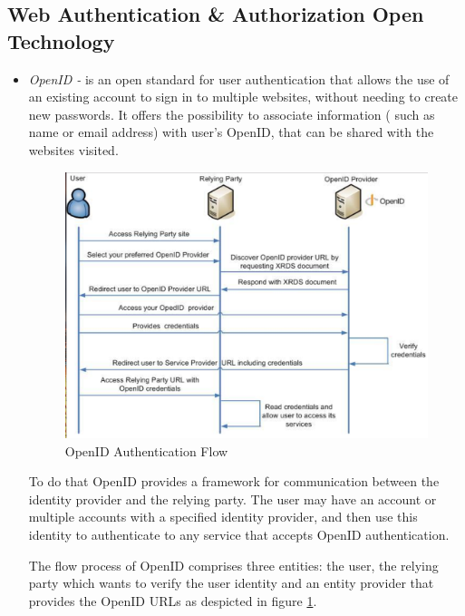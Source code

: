 \subsection{Web Authentication \& Authorization Open Technology}\label{ssec:security}


\begin{itemize}
\item {\it OpenID -} is an open standard for user authentication that allows the use of an existing account to sign in to multiple websites, without needing to create new passwords. It offers the possibility to associate information ( such as name or email address) with user's OpenID, that can be shared with the websites visited.

\begin{figure}[h]
    \centering
    \includegraphics[width=1.0\textwidth]{openID}
    \caption{OpenID Authentication Flow}
    \label{fig:openID}
\end{figure}
To do that OpenID provides a framework for communication between the identity provider and the relying party. The user may have an account or multiple accounts with a specified identity provider, and then use this identity to authenticate to any service that accepts OpenID authentication. 

The flow process of OpenID comprises three entities: the user, the relying party which wants to verify the user identity and an entity provider that provides the OpenID URLs as despicted in figure \ref{fig:openID}.\\


\end{itemize}
